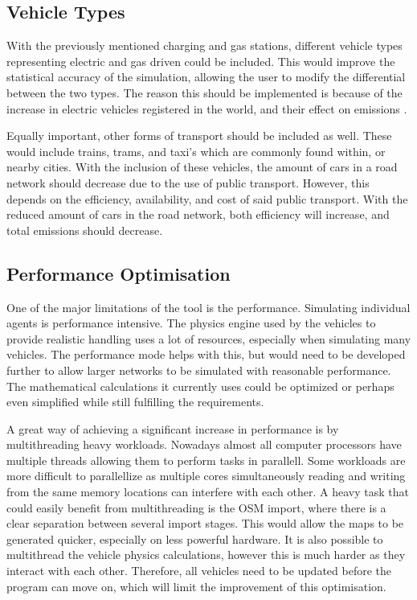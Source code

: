    \subsection{Vehicle Types}
        With the previously mentioned charging and gas stations, different vehicle types representing electric and gas driven could be included. This would improve the statistical accuracy of the simulation, allowing the user to modify the differential between the two types. The reason this should be implemented is because of the increase in electric vehicles registered in the world, and their effect on emissions \cite{IEA}. 
        
        Equally important, other forms of transport should be included as well. These would include trains, trams, and taxi's which are commonly found within, or nearby cities. With the inclusion of these vehicles, the amount of cars in a road network should decrease due to the use of public transport. However, this depends on the efficiency, availability, and cost of said public transport. With the reduced amount of cars in the road network, both efficiency will increase, and total emissions should decrease.

    \subsection{Performance Optimisation}
        One of the major limitations of the tool is the performance. Simulating individual agents is performance intensive. The physics engine used by the vehicles to provide realistic handling uses a lot of resources, especially when simulating many vehicles. The performance mode helps with this, but would need to be developed further to allow larger networks to be simulated with reasonable performance. The mathematical calculations it currently uses could be optimized or perhaps even simplified while still fulfilling the requirements.

        A great way of achieving a significant increase in performance is by multithreading heavy workloads. Nowadays almost all computer processors have multiple threads allowing them to perform tasks in parallell. Some workloads are more difficult to parallellize as multiple cores simultaneously reading and writing from the same memory locations can interfere with each other. A heavy task that could easily benefit from multithreading is the OSM import, where there is a clear separation between several import stages. This would allow the maps to be generated quicker, especially on less powerful hardware. It is also possible to multithread the vehicle physics calculations, however this is much harder as they interact with each other. Therefore, all vehicles need to be updated before the program can move on, which will limit the improvement of this optimisation.


